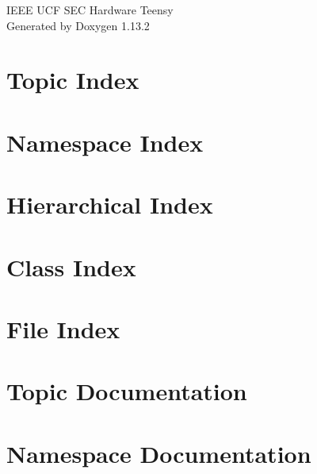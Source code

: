\documentclass[twoside]{book}
\newcommand{\+}{\discretionary{\mbox{\scriptsize$\hookleftarrow$}}{}{}}
\newcommand{\clearemptydoublepage}{%
    \newpage{\pagestyle{empty}\cleardoublepage}%
  }
\begin{document}
  \raggedbottom
    \hypersetup{pageanchor=false,
                bookmarksnumbered=true,
                pdfencoding=unicode
               }
  \begin{titlepage}
  \vspace*{7cm}
  \begin{center}%
  {\Large IEEE UCF SEC Hardware Teensy}\\
  \vspace*{1cm}
  {\large Generated by Doxygen 1.13.2}\\
  \end{center}
  \end{titlepage}
  \clearemptydoublepage
  \tableofcontents
  \clearemptydoublepage
  \hypersetup{pageanchor=true}

\chapter{Topic Index}

\chapter{Namespace Index}

\chapter{Hierarchical Index}

\chapter{Class Index}

\chapter{File Index}

\chapter{Topic Documentation}









\chapter{Namespace Documentation}





\end{document}
